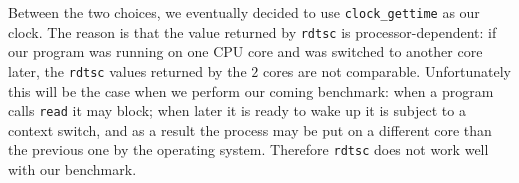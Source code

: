 \documentclass{article}
\begin{document}
Between the two choices, we eventually decided to use \texttt{clock\_gettime} as our clock.
The reason is that the value returned by \texttt{rdtsc} is processor-dependent: if our program was running on one CPU core and was switched to another core later, the \texttt{rdtsc} values returned by the $2$ cores are not comparable.
Unfortunately this will be the case when we perform our coming benchmark: when a program calls \texttt{read} it may block; when later it is ready to wake up it is subject to a context switch, and as a result the process may be put on a different core than the previous one by the operating system.
Therefore \texttt{rdtsc} does not work well with our benchmark.
\end{document}
